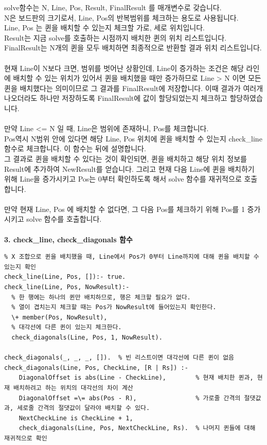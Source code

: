 \documentclass{article}
\begin{document}
\quad solve함수는 N, Line, Pos, Result, FinalResult 를 매개변수로 갖습니다.\\
N은 보드판의 크기로서, Line, Pos의 반복범위를 체크하는 용도로 사용됩니다.\\
Line, Pos 는 퀸을 배치할 수 있는지 체크할 가로, 세로 위치입니다.\\
Result는 지금 solve를 호출하는 시점까지 배치한 퀸의 위치 리스트입니다.\\
FinalResult는 N개의 퀸을 모두 배치하면 최종적으로 반환할 결과 위치 리스트입니다.\\\\
현재 Line이 N보다 크면, 범위를 벗어난 상황인데, Line이 증가하는 조건은 해당 라인에 배치할 수 있는 위치가 있어서 퀸을 배치했을 때만 증가하므로 Line > N 이면 모든 퀸을 배치했다는 의미이므로 그 결과를 FinalResult에 저장합니다. 이때 결과가 여러개 나오더라도 하나만 저장하도록 FinalResult에 값이 할당되었는지 체크하고 할당하였습니다.\\\\
만약 Line <= N 일 때, Line은 범위에 존재하니, Pos를 체크합니다.\\
Pos역시 N범위 안에 있다면 해당 Line, Pos 위치에 퀸을 배치할 수 있는지 check\_line 함수로 체크합니다. 이 함수는 뒤에 설명합니다.\\
그 결과로 퀸을 배치할 수 있다는 것이 확인되면, 퀸을 배치하고 해당 위치 정보를 Result에 추가하여 NewResult를 얻습니다. 그리고 현재 다음 Line에 퀸을 배치하기 위해 Line을 증가시키고 Pos는 0부터 확인하도록 해서 solve 함수를 재귀적으로 호출합니다.\\\\
만약 현재 Line, Pos 에 배치할 수 없다면, 그 다음 Pos를 체크하기 위해 Pos를 1 증가시키고 solve 함수를 호출합니다.\\\\
\textbf{3. check\_line, check\_diagonals 함수}
\begin{verbatim}
% X 조합으로 퀸을 배치했을 때, Line에서 Pos가 0부터 Line까지에 대해 퀸을 배치할 수 있는지 확인
check_line(Line, Pos, []):- true.
check_line(Line, Pos, NowResult):-
  % 한 행에는 하나의 퀸만 배치하므로, 행은 체크할 필요가 없다.
  % 열이 겹치는지 체크할 때는 Pos가 NowResult에 들어있는지 확인한다.
  \+ member(Pos, NowResult),
  % 대각선에 다른 퀸이 있는지 체크한다.
  check_diagonals(Line, Pos, 1, NowResult).

check_diagonals(_, _, _, []).  % 빈 리스트이면 대각선에 다른 퀸이 없음
check_diagonals(Line, Pos, CheckLine, [R | Rs]) :-
    DiagonalOffset is abs(Line - CheckLine),        % 현재 배치한 퀸과, 현재 배치하려고 하는 위치의 대각선의 차이 계산
    DiagonalOffset =\= abs(Pos - R),                % 가로줄 간격의 절댓값과, 세로줄 간격의 절댓값이 달라야 배치할 수 있다.
    NextCheckLine is CheckLine + 1,
    check_diagonals(Line, Pos, NextCheckLine, Rs).  % 나머지 퀸들에 대해 재귀적으로 확인
\end{verbatim}
\end{document}
